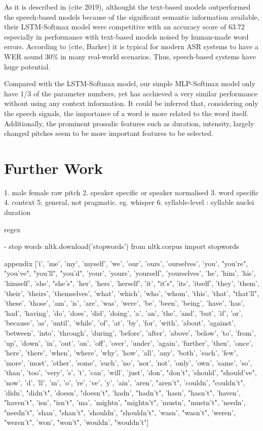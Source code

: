 As it is described in (cite 2019), althought the text-based models outperformed the speech-based models because of the significant semantic information available, their LSTM-Softmax model were competitive with an accuracy score of 63.72 especially in performance with text-based models noised by human-made word errors. According to (cite, Barker) it is typical for modern ASR systems to have a WER aound 30\% in many real-world scenarios. Thus, speech-based systems have huge potential.

Compared with the LSTM-Softmax model, our simple MLP-Softmax model only have 1/3 of the parameter numbers, yet has acchieved a very similar performance without using any context information. It could be inferred that, considering only the speech signals, the importance of a word is more related to the word itself. Additionally, the prominent prosodic features such as duration, intensity, largely changed pitches seem to be more important features to be selected.

\section{Further Work}
1. male female raw pitch
2. speaker specific or speaker normalised
3. word specific
4. context
5. general, not pragmatic.
	eg. whisper
6. syllable-level : syllable nuclei duration

regex

- stop words
nltk.download('stopwords')
from nltk.corpus import stopwords

appendix
['i', 'me', 'my', 'myself', 'we', 'our', 'ours', 'ourselves', 'you', "you're", "you've", "you'll", "you'd", 'your', 'yours', 'yourself', 'yourselves', 'he', 'him', 'his', 'himself', 'she', "she's", 'her', 'hers', 'herself', 'it', "it's", 'its', 'itself', 'they', 'them', 'their', 'theirs', 'themselves', 'what', 'which', 'who', 'whom', 'this', 'that', "that'll", 'these', 'those', 'am', 'is', 'are', 'was', 'were', 'be', 'been', 'being', 'have', 'has', 'had', 'having', 'do', 'does', 'did', 'doing', 'a', 'an', 'the', 'and', 'but', 'if', 'or', 'because', 'as', 'until', 'while', 'of', 'at', 'by', 'for', 'with', 'about', 'against', 'between', 'into', 'through', 'during', 'before', 'after', 'above', 'below', 'to', 'from', 'up', 'down', 'in', 'out', 'on', 'off', 'over', 'under', 'again', 'further', 'then', 'once', 'here', 'there', 'when', 'where', 'why', 'how', 'all', 'any', 'both', 'each', 'few', 'more', 'most', 'other', 'some', 'such', 'no', 'nor', 'not', 'only', 'own', 'same', 'so', 'than', 'too', 'very', 's', 't', 'can', 'will', 'just', 'don', "don't", 'should', "should've", 'now', 'd', 'll', 'm', 'o', 're', 've', 'y', 'ain', 'aren', "aren't", 'couldn', "couldn't", 'didn', "didn't", 'doesn', "doesn't", 'hadn', "hadn't", 'hasn', "hasn't", 'haven', "haven't", 'isn', "isn't", 'ma', 'mightn', "mightn't", 'mustn', "mustn't", 'needn', "needn't", 'shan', "shan't", 'shouldn', "shouldn't", 'wasn', "wasn't", 'weren', "weren't", 'won', "won't", 'wouldn', "wouldn't"]

